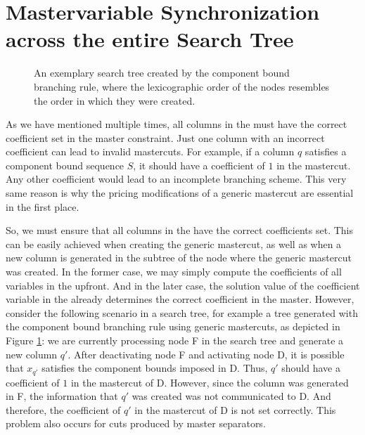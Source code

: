 \section{Mastervariable Synchronization across the entire Search Tree}\label{sec:gm_sync}
\begin{figure}[H]
\centering
{}
\caption{An exemplary search tree created by the component bound branching rule, where the lexicographic order of the nodes resembles the order in which they were created.}
\label{fig:gm_sync_tree}
\end{figure}

As we have mentioned multiple times, all columns in the \RMP{} must have the correct coefficient set in the master constraint. Just one column with an incorrect coefficient can lead to invalid mastercuts. For example, if a column $q$ satisfies a component bound sequence $S$, it should have a coefficient of $1$ in the mastercut. Any other coefficient would lead to an incomplete branching scheme. This very same reason is why the pricing modifications of a generic mastercut are essential in the first place.

So, we must ensure that all columns in the \RMP{} have the correct coefficients set. This can be easily achieved when creating the generic mastercut, as well as when a new column is generated in the subtree of the node where the generic mastercut was created. In the former case, we may simply compute the coefficients of all variables in the \RMP{} upfront. And in the later case, the solution value of the coefficient variable in the \SP{} already determines the correct coefficient in the master. However, consider the following scenario in a search tree, for example a tree generated with the component bound branching rule using generic mastercuts, as depicted in Figure \ref{fig:gm_sync_tree}: we are currently processing node F in the search tree and generate a new column $q'$. After deactivating node F and activating node D, it is possible that $x_{q'}$ satisfies the component bounds imposed in D. Thus, $q'$ should have a coefficient of $1$ in the mastercut of D. However, since the column was generated in F, the information that $q'$ was created was not communicated to D. And therefore, the coefficient of $q'$ in the mastercut of D is not set correctly. This problem also occurs for cuts produced by master separators.

